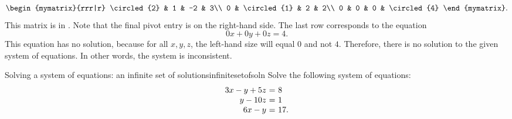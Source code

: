 \begin{solution}
\begin{equation*}
    \begin{mymatrix}{rrr|r}
      \circled{2} &  1 &  -2 & 3\\
      0 &  \circled{1} &   2 & 2\\
      0 & 0 & 0 & \circled{4}
    \end{mymatrix}.
  \end{equation*}
  This matrix is in {\ef}. Note that the final pivot entry is on the
  right-hand side. The last row corresponds to the equation
  \begin{equation*}
    0x + 0y + 0z = 4.
  \end{equation*}
  This equation has no solution, because for all $x,y,z$, the
  left-hand size will equal $0$ and not $4$. Therefore, there is no
  solution to the given system of equations. In other words, the
  system is inconsistent.
\end{solution}

\begin{example}{Solving a system of equations: an infinite set of solutions}{infinitesetofsoln}
  Solve the following system of equations:
  \begin{equation}
    \begin{array}{r@{~}c@{~}l}
      3x  -y  +5z &=& 8 \\
           y -10z &=& 1 \\
      6x  -y      &=& 17.
    \end{array}
  \end{equation}
\end{example}

